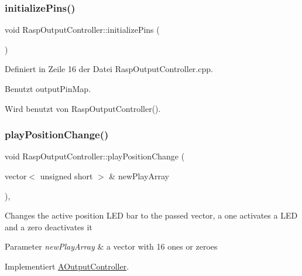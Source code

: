 \subsubsection{\texorpdfstring{initialize\+Pins()}{initializePins()}}
{\footnotesize\ttfamily void Rasp\+Output\+Controller\+::initialize\+Pins (\begin{DoxyParamCaption}{ }\end{DoxyParamCaption})\hspace{0.3cm}{\ttfamily [private]}}



Definiert in Zeile 16 der Datei Rasp\+Output\+Controller.\+cpp.



Benutzt output\+Pin\+Map.



Wird benutzt von Rasp\+Output\+Controller().

\mbox{\label{class_rasp_output_controller_af0304196681872f9c1f6d6f2e2db14a6}} 
\subsubsection{\texorpdfstring{play\+Position\+Change()}{playPositionChange()}\hspace{0.1cm}{\footnotesize\ttfamily [1/2]}}
{\footnotesize\ttfamily void Rasp\+Output\+Controller\+::play\+Position\+Change (\begin{DoxyParamCaption}\item[{vector$<$ unsigned short $>$ \&}]{new\+Play\+Array }\end{DoxyParamCaption})\hspace{0.3cm}{\ttfamily [override]}, {\ttfamily [virtual]}}

Changes the active position L\+ED bar to the passed vector, a one activates a L\+ED and a zero deactivates it 
\begin{DoxyParams}{Parameter}
{\em new\+Play\+Array} & a vector with 16 ones or zeroes \\
\hline
\end{DoxyParams}


Implementiert \hyperlink{class_a_output_controller_a7bad658dfc3eb1223ace0c0454130818}{A\+Output\+Controller}.



